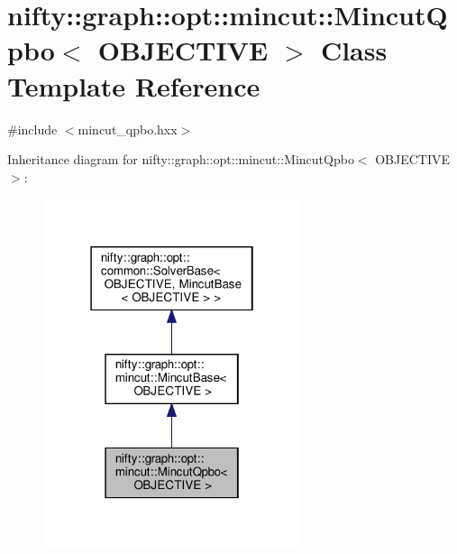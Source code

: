 \hypertarget{classnifty_1_1graph_1_1opt_1_1mincut_1_1MincutQpbo}{}\section{nifty\+:\+:graph\+:\+:opt\+:\+:mincut\+:\+:Mincut\+Qpbo$<$ O\+B\+J\+E\+C\+T\+I\+VE $>$ Class Template Reference}
\label{classnifty_1_1graph_1_1opt_1_1mincut_1_1MincutQpbo}


{\ttfamily \#include $<$mincut\+\_\+qpbo.\+hxx$>$}



Inheritance diagram for nifty\+:\+:graph\+:\+:opt\+:\+:mincut\+:\+:Mincut\+Qpbo$<$ O\+B\+J\+E\+C\+T\+I\+VE $>$\+:
\nopagebreak
\begin{figure}[H]
\begin{center}
\leavevmode
\includegraphics[width=214pt]{classnifty_1_1graph_1_1opt_1_1mincut_1_1MincutQpbo__inherit__graph}
\end{center}
\end{figure}


